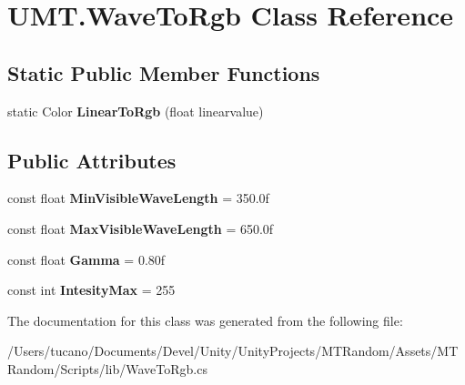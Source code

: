 \hypertarget{class_u_m_t_1_1_wave_to_rgb}{\section{U\+M\+T.\+Wave\+To\+Rgb Class Reference}
\label{class_u_m_t_1_1_wave_to_rgb}
}
\subsection*{Static Public Member Functions}
\begin{DoxyCompactItemize}
\item 
\hypertarget{class_u_m_t_1_1_wave_to_rgb_a6eebc63a7e3c8ceeffb9357fc5fb445f}{static Color {\bfseries Linear\+To\+Rgb} (float linearvalue)}\label{class_u_m_t_1_1_wave_to_rgb_a6eebc63a7e3c8ceeffb9357fc5fb445f}

\end{DoxyCompactItemize}
\subsection*{Public Attributes}
\begin{DoxyCompactItemize}
\item 
\hypertarget{class_u_m_t_1_1_wave_to_rgb_a5913c8e51e683e805b8106fd68859eae}{const float {\bfseries Min\+Visible\+Wave\+Length} = 350.\+0f}\label{class_u_m_t_1_1_wave_to_rgb_a5913c8e51e683e805b8106fd68859eae}

\item 
\hypertarget{class_u_m_t_1_1_wave_to_rgb_a7e0b698dd35aa707713acf4c0c889923}{const float {\bfseries Max\+Visible\+Wave\+Length} = 650.\+0f}\label{class_u_m_t_1_1_wave_to_rgb_a7e0b698dd35aa707713acf4c0c889923}

\item 
\hypertarget{class_u_m_t_1_1_wave_to_rgb_a88115bf78b200a899b477ee32b21fdac}{const float {\bfseries Gamma} = 0.\+80f}\label{class_u_m_t_1_1_wave_to_rgb_a88115bf78b200a899b477ee32b21fdac}

\item 
\hypertarget{class_u_m_t_1_1_wave_to_rgb_a60571bc8e56b4a8e40addeca5c9133e2}{const int {\bfseries Intesity\+Max} = 255}\label{class_u_m_t_1_1_wave_to_rgb_a60571bc8e56b4a8e40addeca5c9133e2}

\end{DoxyCompactItemize}


The documentation for this class was generated from the following file\+:\begin{DoxyCompactItemize}
\item 
/\+Users/tucano/\+Documents/\+Devel/\+Unity/\+Unity\+Projects/\+M\+T\+Random/\+Assets/\+M\+T\+Random/\+Scripts/lib/Wave\+To\+Rgb.\+cs\end{DoxyCompactItemize}
